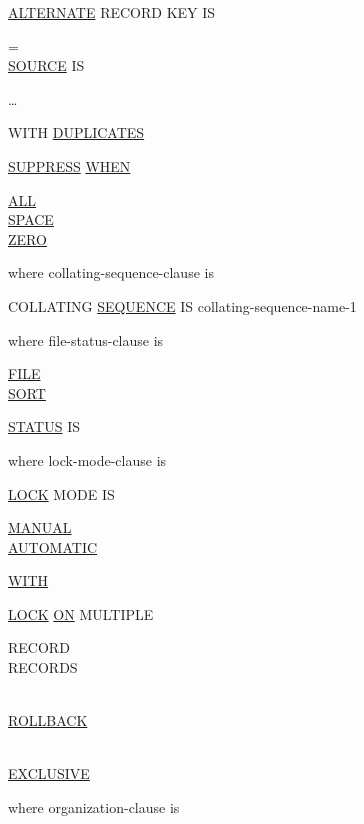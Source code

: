 \documentclass[a4paper,oneside,svgnames]{scrbook}
\makeatletter
\newcommand{\key}[1]{\underline{#1}}
\newcommand{\pending}[1]{%
  \textcolor{gray!75}{#1}}
\newenvironment{0-1}{$\left[ \begin{tabular}{@{}l@{}}}{\end{tabular} \right]$}
\newenvironment{1=}{$\left\{ \begin{tabular}{@{}l@{}}}{\end{tabular} \right\}$}
\makeatother
\begin{document}
\key{ALTERNATE} RECORD KEY IS \identifier
\pending{
  \begin{0-1}
    \begin{1=}
      = \\
      \key{SOURCE} IS \\
    \end{1=}
    \begin{1=}
      \identifier
    \end{1=}\ldots
  \end{0-1}
}
\begin{0-1}
  WITH \key{DUPLICATES}
\end{0-1}
\pending{
  \begin{0-1}
    \key{SUPPRESS} \key{WHEN}
    \begin{1=}
      \key{ALL} \literal \\
      \key{SPACE} \\
      \key{ZERO}
    \end{1=}
  \end{0-1}
}

where collating-sequence-clause is

\pending{COLLATING \key{SEQUENCE} IS collating-sequence-name-1}


where file-status-clause is

\begin{0-1}
  \key{FILE} \\
  \key{SORT}
\end{0-1}
\key{STATUS} IS \identifier

where lock-mode-clause is

\key{LOCK} MODE IS
\begin{1=}
  \begin{1=}
    \begin{1=}
      \key{MANUAL} \\
      \key{AUTOMATIC}
    \end{1=}
    \key{WITH}
    \begin{1=}
      \key{LOCK} \key{ON} MULTIPLE
      \begin{1=}
        RECORD \\
        RECORDS
      \end{1=} \\
      \pending{\key{ROLLBACK}}
    \end{1=}
  \end{1=} \\
  \key{EXCLUSIVE}
\end{1=}

where organization-clause is
\end{document}
